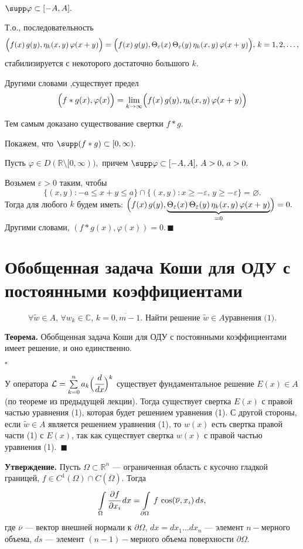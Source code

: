 \documentclass[unicode,12pt,draft]{article}
\begin{document}
$\supp \varphi\subset[-A,A].$

Т.о., последовательность
$$\Bigl(f(x)\,g(y),\eta_k(x,y)\,\varphi(x+y)\Bigr)=
\Bigl(f(x)\,g(y),\Theta_{\varepsilon}(x)\,\Theta_{\varepsilon}(y)\,\eta_k(x,y)\,\varphi(x+y)\Bigr),\,k=1,2,\ldots,$$
стабилизируется с некоторого достаточно большого $k$.

Другими словами ,существует предел
$$\Bigl(f*g(x),\varphi(x)\Bigr)
=\lim\limits_{k\to\infty}\Bigl(f(x)\,g(y),\eta_k(x,y)\,\varphi(x+y)\Bigr)$$

Тем самым доказано существование свертки $f*g.$

Покажем, что $\supp (f*g)\subset[0,\infty).$

Пусть $\varphi \in D(\mathbb R\setminus [0,\infty)),$ причем
$\supp \varphi\subset[-A,A],\, A>0,\,a>0.$

Возьмем $\varepsilon>0$ таким, чтобы $$\{(x,y)\colon -a\le x+y\le
a\}\cap\{(x,y)\colon x\ge-\varepsilon,\,
y\ge-\varepsilon\}=\varnothing.$$ Тогда для любого $k$ будем
иметь:
$\Bigl(f(x)\,g(y),\underbrace{\Theta_{\varepsilon}(x)\,\Theta_{\varepsilon}(y)\,\eta_k(x,y)\,\varphi(x+y)}_{=0}\Bigr)=0.$
Другими словами, $(f*g(x),\varphi(x))=0.\,\blacksquare$

\section{Обобщенная задача Коши для ОДУ с постоянными коэффициентами}

$$\forall \tilde w\in A,\,\forall w_k\in \mathbb
C,\,k=\overline{0,m-1}.\mbox{ Найти решение }\tilde w\in A \mbox{
уравнения (1).}$$

\textbf{Теорема.} Обобщенная задача Коши для ОДУ с постоянными
коэффициентами имеет решение, и оно единственно.

$\square$

У оператора $\mathcal L=\sum\limits_{k=0}^n a_k \Bigl(\cfrac
d{dx}\Bigr)^k$ существует фундаментальное решение $E(x)\in A$ (по
теореме из предыдущей лекции). Тогда существует свертка $E(x)$ с
правой частью уравнения (1), которая будет решением уравнения (1).
С другой стороны, если $\tilde w\in A$ является решением уравнения
(1), то $w(x)$ есть свертка правой части (1) с $E(x)$, так как
существует свертка $w(x)$ с правой частью уравнения (1).
$\,\blacksquare$


\textbf{Утверждение.} Пусть $\Omega\subset\mathbb R^n$ ---
ограниченная область с кусочно гладкой границей, $f\in
C^1(\Omega)\cap C(\overline{\Omega}).$ Тогда
$$\int\limits_{\Omega}\cfrac{\partial f}{\partial
x_i}\,dx=\int\limits_{\partial\Omega}\,f\,\cos(\overline{\nu},x_i)\,ds,$$
где $\overline{\nu}$ --- вектор внешней нормали к
$\partial\Omega,\,dx=dx_1\ldots dx_n$ --- элемент $n-$мерного
объема, $ds$ --- элемент $(n-1)-$мерного объема поверхности
$\partial\Omega$.
\end{document}
